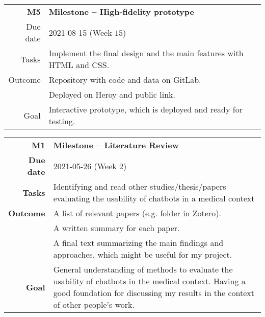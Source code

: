 \begin{table}[h]
\small
\colorbox{usethiscolorhere}{
\centering
\begin{tabularx}{\textwidth}{@{} r Y @{}}
	\textbf{M5}
	& \textbf{Milestone --  High-fidelity prototype}\vspace{2mm}\\
	Due date & 2021-08-15 (Week $15$)\vspace{2mm}\\
     Tasks & Implement the final design and the main features with HTML and CSS. \vspace{2mm}\\
    Outcome & Repository with code and data on GitLab.\\
    & Deployed on Heroy and public link.\vspace{2mm}\\
    Goal & Interactive prototype, which is deployed and ready for testing.\vspace{2mm}\\
\end{tabularx}
}
\end{table}

\begin{table}[h]
\small
\colorbox{usethiscolorhere}{
\centering
\begin{tabularx}{\textwidth}{@{} r Y @{}}
	\textbf{M1}
	& \textbf{Milestone -- Literature Review}\vspace{2mm}\\
	\textbf{Due date} & 2021-05-26 (Week $2$)\vspace{2mm}\\
     \textbf{Tasks} & Identifying and read other studies/thesis/papers evaluating the usability of chatbots in a medical context\vspace{2mm}\\
    \textbf{Outcome} & A list of relevant papers (e.g. folder in Zotero).\\
    & A written summary for each paper.\\
    & A final text summarizing the main findings and approaches, which might be useful for my project. \vspace{2mm}\\
    \textbf{Goal} & General understanding of methods to evaluate the usability of chatbots in the medical context. Having a good foundation for discussing my results in the context of other people's work.\vspace{2mm}\\
    
\end{tabularx}
}
\end{table}

